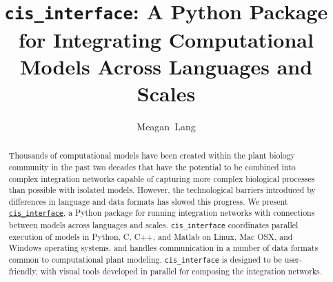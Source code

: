 \documentclass[journal]{IEEEtran}
\newcommand{\cis}{{\tt cis\_interface}{}}
\begin{document}
\shorttitle{{\cis}}

\title{{\cis}: A Python Package for Integrating Computational Models Across Languages and Scales}

\author{Meagan~Lang}



\begin{abstract}
Thousands of computational models have been created within the plant biology community in the past two decades that have the potential to be combined into complex integration networks capable of capturing more complex biological processes than possible with isolated models. However, the technological barriers introduced by differences in language and data formats has slowed this progress. We present \href{https://github.com/cropsinsilico/cis_interface}{\cis}, a Python package for running integration networks with connections between models across languages and scales. {\cis} coordinates parallel execution of models in Python, C, C++, and Matlab on Linux, Mac OSX, and Windows operating systems, and handles communication in a number of data formats common to computational plant modeling. {\cis} is designed to be user-friendly, with visual tools developed in parallel for composing the integration networks. 
\end{abstract}




\maketitle
\end{document}
